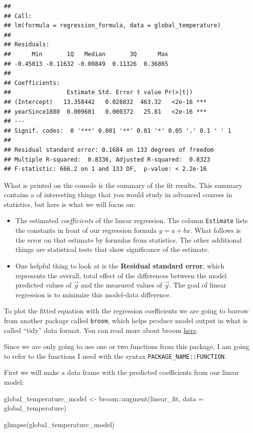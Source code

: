 \documentclass[
]{book}
\newenvironment{Shaded}{\begin{snugshade}}{\end{snugshade}}
\newcommand{\AttributeTok}[1]{\textcolor[rgb]{0.77,0.63,0.00}{#1}}
\newcommand{\FunctionTok}[1]{\textcolor[rgb]{0.00,0.00,0.00}{#1}}
\newcommand{\NormalTok}[1]{#1}
\newcommand{\OtherTok}[1]{\textcolor[rgb]{0.56,0.35,0.01}{#1}}
\newcommand{\SpecialCharTok}[1]{\textcolor[rgb]{0.00,0.00,0.00}{#1}}
\providecommand{\tightlist}{%
  \setlength{\itemsep}{0pt}\setlength{\parskip}{0pt}}
\theoremstyle{definition}
\theoremstyle{definition}
\theoremstyle{definition}
\theoremstyle{remark}
\begin{document}
\begin{verbatim}
## 
## Call:
## lm(formula = regression_formula, data = global_temperature)
## 
## Residuals:
##      Min       1Q   Median       3Q      Max 
## -0.45013 -0.11632 -0.00849  0.11326  0.36865 
## 
## Coefficients:
##                Estimate Std. Error t value Pr(>|t|)    
## (Intercept)   13.358442   0.028832  463.32   <2e-16 ***
## yearSince1880  0.009601   0.000372   25.81   <2e-16 ***
## ---
## Signif. codes:  0 '***' 0.001 '**' 0.01 '*' 0.05 '.' 0.1 ' ' 1
## 
## Residual standard error: 0.1684 on 133 degrees of freedom
## Multiple R-squared:  0.8336, Adjusted R-squared:  0.8323 
## F-statistic: 666.2 on 1 and 133 DF,  p-value: < 2.2e-16
\end{verbatim}

What is printed on the console is the summary of the fit results. This summary contains a of interesting things that you would study in advanced courses in statistics, but here is what we will focus on:

\begin{itemize}
\tightlist
\item
  The estimated \emph{coefficients} of the linear regression. The column \texttt{Estimate} lists the constants in front of our regression formula \(y=a+bx\). What follows is the error on that estimate by formulas from statistics. The other additional things are statistical tests that show significance of the estimate.
\item
  One helpful thing to look at is the \textbf{Residual standard error}, which represents the overall, total effect of the differences between the model predicted values of \(\vec{y}\) and the measured values of \(\vec{y}\). The goal of linear regression is to minimize this model-data difference.
\end{itemize}

To plot the fitted equation with the regression coefficients we are going to borrow from another package called \texttt{broom}, which helps produce model output in what is called ``tidy'' data format. You can read more about broom \href{https://broom.tidymodels.org/index.html}{here}.

Since we are only going to use one or two functions from this package, I am going to refer to the functions I need with the syntax \texttt{PACKAGE\_NAME::FUNCTION}.

First we will make a data frame with the predicted coefficients from our linear model:

\begin{Shaded}
\begin{Highlighting}[]
\NormalTok{global\_temperature\_model }\OtherTok{\textless{}{-}}\NormalTok{ broom}\SpecialCharTok{::}\FunctionTok{augment}\NormalTok{(linear\_fit, }\AttributeTok{data =}\NormalTok{ global\_temperature)}

\FunctionTok{glimpse}\NormalTok{(global\_temperature\_model)}
\end{Highlighting}
\end{Shaded}
\end{document}

